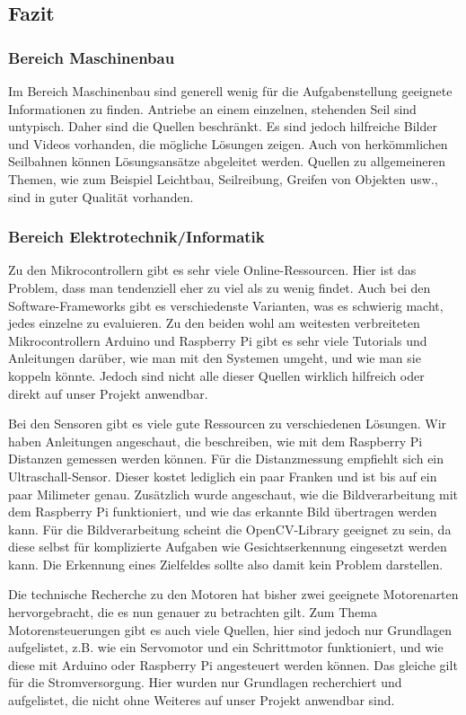 \documentclass[a4paper,11pt]{scrartcl}
\begin{document}
\subsection{Fazit}

\subsubsection{Bereich Maschinenbau}

Im Bereich Maschinenbau sind generell wenig für die Aufgabenstellung geeignete Informationen zu finden. Antriebe an einem einzelnen, stehenden Seil sind untypisch. Daher sind die Quellen beschränkt. Es sind jedoch hilfreiche Bilder und Videos vorhanden, die mögliche Lösungen zeigen. Auch von herkömmlichen Seilbahnen können Lösungsansätze abgeleitet werden. Quellen zu allgemeineren Themen, wie zum Beispiel Leichtbau, Seilreibung, Greifen von Objekten usw., sind in guter Qualität vorhanden.

\subsubsection{Bereich Elektrotechnik/Informatik}

Zu den Mikrocontrollern gibt es sehr viele Online-Ressourcen. Hier ist das Problem, dass man tendenziell eher zu viel als zu wenig findet. Auch bei den Software-Frameworks gibt es verschiedenste Varianten, was es schwierig macht, jedes einzelne zu evaluieren. Zu den beiden wohl am weitesten verbreiteten Mikrocontrollern Arduino und Raspberry Pi gibt es sehr viele Tutorials und Anleitungen darüber, wie man mit den Systemen umgeht, und wie man sie koppeln könnte. Jedoch sind nicht alle dieser Quellen wirklich hilfreich oder direkt auf unser Projekt anwendbar.

Bei den Sensoren gibt es viele gute Ressourcen zu verschiedenen Lösungen. Wir haben Anleitungen angeschaut, die beschreiben, wie mit dem Raspberry Pi Distanzen gemessen werden können. Für die Distanzmessung empfiehlt sich ein Ul\-tra\-schall-Sen\-sor. Dieser kostet lediglich ein paar Franken und ist bis auf ein paar Milimeter genau. Zusätzlich wurde angeschaut, wie die Bildverarbeitung mit dem Raspberry Pi funktioniert, und wie das erkannte Bild übertragen werden kann. Für die Bildverarbeitung scheint die OpenCV-Library geeignet zu sein, da diese selbst für komplizierte Aufgaben wie Gesichtserkennung eingesetzt werden kann. Die Erkennung eines Zielfeldes sollte also damit kein Problem darstellen.

Die technische Recherche zu den Motoren hat bisher zwei geeignete Motorenarten hervorgebracht, die es nun genauer zu betrachten gilt. Zum Thema Motorensteuerungen gibt es auch viele Quellen, hier sind jedoch nur Grundlagen aufgelistet, z.B. wie ein Servomotor und ein Schrittmotor funktioniert, und wie diese mit Arduino oder Raspberry Pi angesteuert werden können. Das gleiche gilt für die Stromversorgung. Hier wurden nur Grundlagen recherchiert und aufgelistet, die nicht ohne Weiteres auf unser Projekt anwendbar sind.
\end{document}
